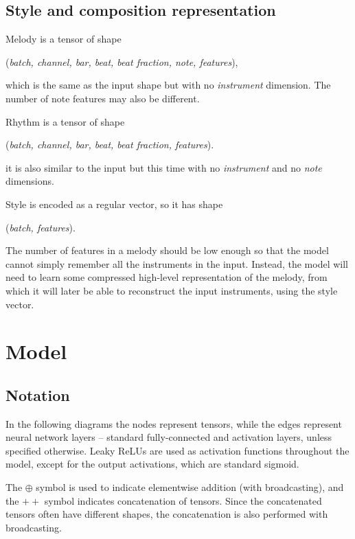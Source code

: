 \documentclass[en]{pracamgr}
\begin{document}
\section{Style and composition representation}

Melody is a tensor of shape
\begin{center}
    (\emph{batch, channel, bar, beat, beat fraction, note, features}),
\end{center}
which is the same as the input shape but with no \emph{instrument} dimension.
The number of note features may also be different.

Rhythm is a tensor of shape
\begin{center}
    (\emph{batch, channel, bar, beat, beat fraction, features}).
\end{center}
it is also similar to the input but this time with no \emph{instrument} and no \emph{note} dimensions.

Style is encoded as a regular vector, so it has shape
\begin{center}
    (\emph{batch, features}).
\end{center}

The number of features in a melody should be low enough so that the model cannot simply remember all the instruments in the input.
Instead, the model will need to learn some compressed high-level representation of the melody, from which it will later be able to reconstruct the input instruments, using the style vector.

\chapter{Model}

\section{Notation}

In the following diagrams the nodes represent tensors, while the edges represent neural network layers -- standard fully-connected and activation layers, unless specified otherwise.
Leaky ReLUs are used as activation functions throughout the model, except for the output activations, which are standard sigmoid.

The $\oplus$ symbol is used to indicate elementwise addition (with broadcasting), and the $++$ symbol indicates concatenation of tensors.
Since the concatenated tensors often have different shapes, the concatenation is also performed with broadcasting.
\end{document}
